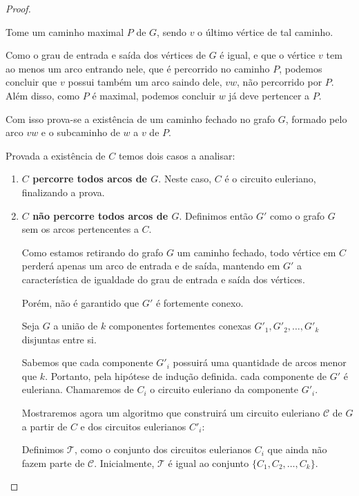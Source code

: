 \documentclass[12pt, a4paper]{article}
\begin{document}
\begin{proof}
\begin{tcolorbox}
        Tome um caminho maximal $P$ de $G$, sendo $v$ o último vértice de tal caminho.

        Como o grau de entrada e saída dos vértices de $G$ é igual, e que o vértice $v$ tem ao menos um arco entrando nele, que é percorrido no caminho $P$, podemos concluir que $v$ possui também um arco saindo dele, $vw$, não percorrido por $P$.
        Além disso, como $P$ é maximal, podemos concluir $w$ já deve pertencer a $P$.

        Com isso prova-se a existência de um caminho fechado no grafo $G$, formado pelo arco $vw$ e o subcaminho de $w$ a $v$ de $P$.
    \end{tcolorbox}

    Provada a existência de $C$ temos dois casos a analisar:

    \begin{enumerate}
        \item \textbf{$C$ percorre todos arcos de $G$}.
            Neste caso, $C$ é o circuito euleriano, finalizando a prova.

        \item \textbf{$C$ não percorre todos arcos de $G$}.
            Definimos então $G'$ como o grafo $G$ sem os arcos pertencentes a $C$.

            Como estamos retirando do grafo $G$ um caminho fechado, todo vértice em $C$ perderá apenas um arco de entrada e de saída, mantendo em $G'$ a característica de igualdade do grau de entrada e saída dos vértices.

            Porém, não é garantido que $G'$ é fortemente conexo. 

            Seja $G$ a união de $k$ componentes fortementes conexas $G'_1, G'_2, \dots, G'_k$ disjuntas entre si.

            Sabemos que cada componente $G'_i$ possuirá uma quantidade de arcos menor que $k$. 
            Portanto, pela hipótese de indução definida. cada componente de $G'$ é euleriana.
            Chamaremos de $C_i$ o circuito euleriano da componente $G'_i$.

            Mostraremos agora um algoritmo que construirá um circuito euleriano $\mathcal{C}$ de $G$ a partir de $C$ e dos circuitos eulerianos $C'_i$:


            Definimos $\mathcal{T}$, como o conjunto dos circuitos eulerianos $C_i$ que ainda não fazem parte de $\mathcal{C}$. 
            Inicialmente, $\mathcal{T}$ é igual ao conjunto $\{C_1, C_2, \dots, C_k\}$.



\end{enumerate}
\end{proof}
\end{document}
